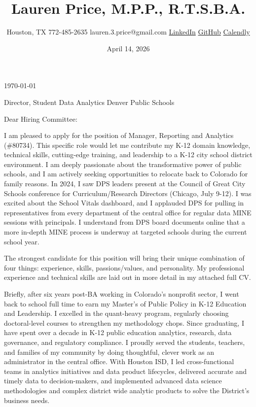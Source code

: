 \documentclass[
  letterpaper,
  DIV=11,
  numbers=noendperiod]{scrartcl}
\title{Lauren Price, M.P.P., R.T.S.B.A.}
\subtitle{Houston, TX \textbar{} 772-485-2635 \textbar{}
lauren.3.price@gmail.com \textbar{}
\href{https://www.linkedin.com/in/lauren-price-data/}{LinkedIn}
\textbar{} \href{https://github.com/pricele2}{GitHub} \textbar{}
\href{https://calendly.com/lauren-3-price/quick-chat}{Calendly}}
\author{}
\date{April 14, 2026}
\makeatletter
\renewcommand{\maketitle}{\bgroup\setlength{\parindent}{0pt}
\begin{flushleft} %
  {\sffamily\huge\textbf{\@title}} \vspace{4pt} \newline
  {\Large {\@subtitle}} \vspace{0pt} %
\end{flushleft}\egroup
}
\makeatother
\begin{document}
\maketitle


\justify

\setlength{\parindent}{0pt}

\pagestyle{mystyle}


\today

Director, Student Data Analytics \newline Denver Public Schools

Dear Hiring Committee:

I am pleased to apply for the position of Manager, Reporting and
Analytics (\#80734). This specific role would let me contribute my K-12
domain knowledge, technical skills, cutting-edge training, and
leadership to a K-12 city school district environment. I am deeply
passionate about the transformative power of public schools, and I am
actively seeking opportunities to relocate back to Colorado for family
reasons. In 2024, I saw DPS leaders present at the Council of Great City
Schools conference for Curriculum/Research Directors (Chicago, July
9-12). I was excited about the School Vitals dashboard, and I applauded
DPS for pulling in representatives from every department of the central
office for regular data MINE sessions with principals. I understand from
DPS board documents online that a more in-depth MINE process is underway
at targeted schools during the current school year.

The strongest candidate for this position will bring their unique
combination of four things: experience, skills, passions/values, and
personality. My professional experience and technical skills are laid
out in more detail in my attached full CV.

Briefly, after six years post-BA working in Colorado's nonprofit sector,
I went back to school full time to earn my Master's of Public Policy in
K-12 Education and Leadership. I excelled in the quant-heavy program,
regularly choosing doctoral-level courses to strengthen my methodology
chops. Since graduating, I have spent over a decade in K-12 public
education analytics, research, data governance, and regulatory
compliance. I proudly served the students, teachers, and families of my
community by doing thoughtful, clever work as an administrator in the
central office. With Houston ISD, I led cross-functional teams in
analytics initiatives and data product lifecycles, delivered accurate
and timely data to decision-makers, and implemented advanced data
science methodologies and complex district wide analytic products to
solve the District's business needs.
\end{document}
